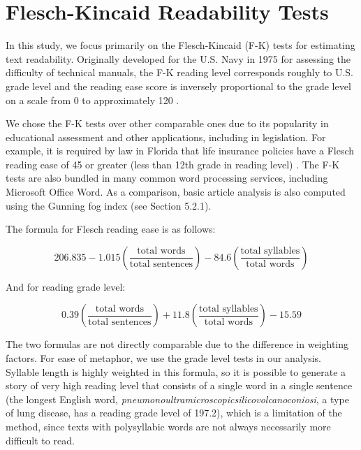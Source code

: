 \section{Flesch-Kincaid Readability Tests} 
In this study, we focus primarily on the Flesch-Kincaid (F-K) tests for estimating text readability. Originally developed for the U.S. Navy in 1975 for assessing the difficulty of technical manuals, the F-K reading level corresponds roughly to U.S. grade level and the reading ease score is inversely proportional to the grade level on a scale from 0 to approximately 120 \cite{kincaid1975derivation}.

We chose the F-K tests over other comparable ones due to its popularity in educational assessment and other applications, including in legislation. For example, it is required by law in Florida that life insurance policies have a Flesch reading ease of 45 or greater (less than 12th grade in reading level) \cite{Statu37online}. The F-K tests are also bundled in many common word processing services, including Microsoft Office Word. As a comparison, basic article analysis is also computed using the Gunning fog index (see Section 5.2.1).

The formula for Flesch reading ease is as follows:

$$206.835 - 1.015 \left( \frac{\mbox{total words}}{\mbox{total sentences}} \right) - 84.6 \left( \frac{\mbox{total syllables}}{\mbox{total words}} \right)$$

And for reading grade level:

$$0.39 \left ( \frac{\mbox{total words}}{\mbox{total sentences}} \right ) + 11.8 \left ( \frac{\mbox{total syllables}}{\mbox{total words}} \right ) - 15.59$$
 
The two formulas are not directly comparable due to the difference in weighting factors. For ease of metaphor, we use the grade level tests in our analysis. Syllable length is highly weighted in this formula, so it is possible to generate a story of very high reading level that consists of a single word in a single sentence (the longest English word, \emph{pneumonoultramicroscopicsilicovolcanoconiosi}, a type of lung disease, has a reading grade level of 197.2), which is a limitation of the method, since texts with polysyllabic words are not always necessarily more difficult to read.
  